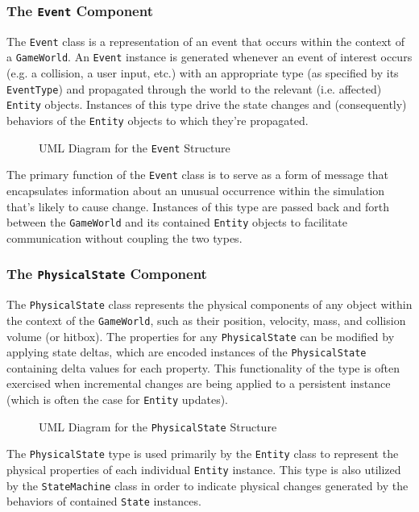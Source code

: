 \documentclass{article}
\newcommand{\classname}[1] {\texttt{#1}}
\newcommand{\insertdiagram}[2]
{
	\begin{figure}[H]
		\centering
		\fbox{\texttt{[image: figures/\#1]}}
		\caption{UML Diagram for the \classname{#1} Structure}
	\end{figure}
}
\begin{document}
			\subsubsection[\classname{Event}]{The \classname{Event} Component}
			The \classname{Event} class is a representation of an event that occurs
			within the context of a \classname{GameWorld}.  An \classname{Event}
			instance is generated whenever an event of interest occurs (e.g. a
			collision, a user input, etc.) with an appropriate type (as specified
			by its \classname{EventType}) and propagated through the world to the
			relevant (i.e. affected) \classname{Entity} objects.  Instances of this
			type drive the state changes and (consequently) behaviors of the
			\classname{Entity} objects to which they're propagated.

			\insertdiagram{Event}{2.0in}

			The primary function of the \classname{Event} class is to serve as
			a form of message that encapsulates information about an unusual
			occurrence within the simulation that's likely to cause change.
			Instances of this type are passed back and forth between the
			\classname{GameWorld} and its contained \classname{Entity} objects
			to facilitate communication without coupling the two types.

			\subsubsection[\classname{PhysicalState}]{The \classname{PhysicalState} Component}
			The \classname{PhysicalState} class represents the physical components
			of any object within the context of the \classname{GameWorld}, such as
			their position, velocity, mass, and collision volume (or hitbox).
			The properties for any \classname{PhysicalState} can be modified by
			applying state deltas, which are encoded instances of the
			\classname{PhysicalState} containing delta values for each property.
			This functionality of the type is often exercised when incremental
			changes are being applied to a persistent instance (which is often
			the case for \classname{Entity} updates).

			\insertdiagram{PhysicalState}{3.0in}

			The \classname{PhysicalState} type is used primarily by the
			\classname{Entity} class to represent the physical properties of
			each individual \classname{Entity} instance.  This type is also
			utilized by the \classname{StateMachine} class in order to
			indicate physical changes generated by the behaviors of contained
			\classname{State} instances.
\end{document}
